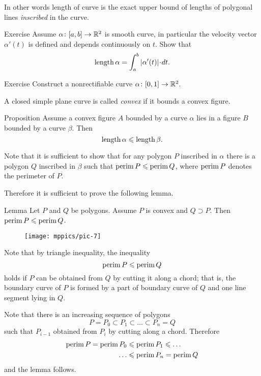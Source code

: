 In other words length of curve is the exact upper bound of lengths of polygonal lines \emph{inscribed} in the curve.

\begin{thm}{Exercise}
Assume $\alpha\colon[a,b]\to\mathbb{R}^2$ is smooth curve, in particular the velocity vector $\alpha'(t)$ is defined and depends continuously on $t$.
Show that
\[\length \alpha=\int_a^b|\alpha'(t)|\cdot dt.\]
\end{thm}

\begin{thm}{Exercise}\label{ex:nonrectifiable-curve}
Construct a nonrectifiable curve $\alpha\colon[0,1]\to\mathbb{R}^2$.
\end{thm}

A closed simple plane curve is called \emph{convex} if it bounds a convex figure.

\begin{thm}{Proposition}\label{prop:convex-curve}
Assume a convex figure $A$ bounded by a curve $\alpha$ lies in a figure $B$ bounded by a curve $\beta$.
Then
\[\mathop{\rm length}\nolimits\alpha\leqslant \mathop{\rm length}\nolimits\beta.\]
\end{thm}

Note that it is sufficient to show that for any polygon  $P$ inscribed in $\alpha$ there is a polygon $Q$ inscribed in $\beta$ such that 
$\mathop{\rm perim}\nolimits P\leqslant \mathop{\rm perim}\nolimits Q$, where $\mathop{\rm perim}\nolimits P$ denotes the perimeter of $P$.

Therefore it is sufficient to prove the following lemma.

\begin{thm}{Lemma}\label{lem:perimeter}
Let $P$ and $Q$ be polygons.
Assume $P$ is convex and $Q\supset P$.
Then $\mathop{\rm perim}\nolimits P\leqslant \mathop{\rm perim}\nolimits Q$.
\end{thm}

\begin{wrapfigure}{r}{24 mm}
\vskip-4mm
\centering
\texttt{[image: mppics/pic-7]}
\end{wrapfigure}

Note that by triangle inequality,
the inequality
\[\mathop{\rm perim}\nolimits P\leqslant \mathop{\rm perim}\nolimits Q\]
holds
if $P$ can be obtained from $Q$ by cutting it along a chord;
that is, the boundary curve of $P$ is formed by a part of boundary curve of $Q$ and one line segment lying in $Q$.

Note that there is an increasing sequence of polygons 
$$P=P_0\subset P_1\subset\dots\subset P_n=Q$$
such that $P_{i-1}$ obtained from $P_{i}$ by cutting along a chord.
Therefore 
\begin{align*}
\mathop{\rm perim}\nolimits P=\mathop{\rm perim}\nolimits P_0&\leqslant\mathop{\rm perim}\nolimits P_1\leqslant\dots
\\
\dots&\leqslant\mathop{\rm perim}\nolimits P_n=\mathop{\rm perim}\nolimits Q
\end{align*}
and the lemma follows.
\qeds


